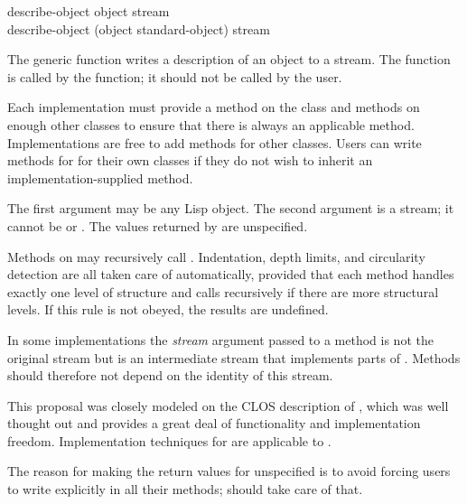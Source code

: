 \begin{defun}
describe-object object stream \\
describe-object (object standard-object) stream

The generic function  writes a description of an object to a
  stream.  The function  is called by the  function; it
  should not be called by the user.

  Each implementation must provide a method on the class
   and methods on enough other classes to ensure that
  there is always an applicable method.  Implementations are free to add
  methods for other classes.  Users can write methods for  for
  their own classes if they do not wish to inherit an implementation-supplied
  method.

   The first argument may be any Lisp object.  The second argument is a stream; it
   cannot be  or .
   The values returned by  are unspecified.

   Methods on  may recursively call .  Indentation,
   depth limits, and circularity detection are all taken care of automatically,
   provided that each method handles exactly one level of structure and calls
    recursively if there are more structural levels.
   If this rule is not obeyed, the results are undefined.

   In some implementations the \emph{stream} argument passed to a 
   method is not the original stream but is an intermediate stream that
   implements parts of .  Methods should therefore not depend on the
   identity of this stream.

\beforenoterule
\begin{rationale}
 This proposal was closely modeled on the CLOS description of ,
 which was well thought out and provides a great deal of functionality and
 implementation freedom.  Implementation techniques for
  are applicable to .

 The reason for making the return values for  unspecified is to
 avoid forcing users to write  explicitly in all their methods;
  should take care of that.
\end{rationale}
\afternoterule
\end{defun}

